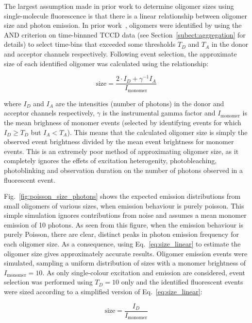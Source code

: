 The largest assumption made in prior work to determine oligomer sizes using single-molecule fluorescence is that there is a linear relationship between oligomer size and photon emission. In prior work~\cite{cremades2012}, oligomers were identified by using the AND criterion on time-binnned TCCD data (see Section~\ref{subect:aggregation} for details) to select time-bins that exceeded some thresholds $T_D$ and $T_A$ in the donor and acceptor channels respectively. Following event selection, the approximate size of each identified oligomer was calculated using the relationship:

\begin{equation}
\text{size} = \frac{2\cdot I_D + \gamma^{-1} I_A}{I_{\text{monomer}}}
\label{eq:size_linear}
\end{equation}

where $I_D$ and $I_A$ are the intensities (number of photons) in the donor and acceptor channels respectively, $\gamma$ is the instrumental gamma factor and $I_{\text{monomer}}$ is the mean brighness of monomer events (selected by identifying events for which $I_D \geq T_D$ but $I_A < T_A$). This means that the calculated oligomer size is simply the observed event brightness divided by the mean event brightness for monomer events. This is an extremely poor method of approximating oligomer size, as it completely ignores the effets of excitation heterogenity, photobleaching, photoblinking and observation duration on the number of photons observed in a fluorescent event.

Fig.~\ref{fig:poisson_size_photons} shows the expected emission distributions from small oligomers of various sizes, when emission behaviour is purely poisson. This simple simulation ignores contributions from noise and assumes a mean monomer emission of 10 photons. As seen from this figure, when the emission behaviour is purely Poisson, there are clear, distinct peaks in photon emission frequency for each oligomer size. As a consequence, using Eq.~\ref{eq:size_linear} to estimate the oligomer size gives approximately accurate results. Oligomer emission events were simulated, sampling a uniform distribution of sizes with a monomer brightness of $I_{\text{monomer}} = 10$. As only single-colour excitation and emission are considered, event selection was performed using $T_D = 10$ only and the identified fluorescent events were sized according to a simplified version of Eq.~\ref{eq:size_linear}:

\begin{equation}
\text{size} = \frac{I_D}{I_{\text{monomer}}}
\label{eq:size_linear_simple}
\end{equation}

